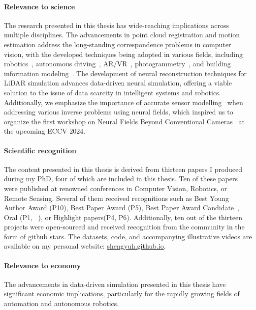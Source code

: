 \paragraph{Relevance to science}
The research presented in this thesis has wide-reaching implications across multiple disciplines. The advancements in point cloud registration and motion estimation address the long-standing correspondence problems in computer vision, with the developed techniques being adopted in various fields, including robotics~\cite{wen2024foundationpose}, autonomous driving~\cite{seidenschwarz2024semoli}, AR/VR~\cite{Zhao_2023_ICCV}, photogrammetry~\cite{xu2023point_isprs}, and building information modeling~\cite{rashdi2022scanning}. The development of neural reconstruction techniques for LiDAR simulation advances data-driven neural simulation, offering a viable solution to the issue of data scarcity in intelligent systems and robotics. Additionally, we emphasize the importance of accurate sensor modelling~\cite{ehret2024radar,klinghoffer2024platonerf} when addressing various inverse problems using neural fields, which inspired us to organize the first workshop on Neural Fields Beyond Conventional Cameras~\cite{nfcc} at the upcoming ECCV 2024.


\paragraph{Scientific recognition}
The content presented in this thesis is derived from thirteen papers I produced during my PhD, four of which are included in this thesis. Ten of these papers were published at renowned conferences in Computer Vision, Robotics, or Remote Sensing. Several of them received recognitions such as Best Young Author Award (P10), Best Paper Award (P5), Best Paper Award Candidate~\cite{ke2023marigold}, Oral (P1, ~\cite{ke2023marigold}), or Highlight papers(P4, P6). Additionally, ten out of the thirteen projects were open-sourced and received recognition from the community in the form of github stars. The datasets, code, and accompanying illustrative videos are available on my personal website: \url{shengyuh.github.io}.

\paragraph{Relevance to economy}
The advancements in data-driven simulation presented in this thesis have significant economic implications, particularly for the rapidly growing fields of automation and autonomous robotics.

